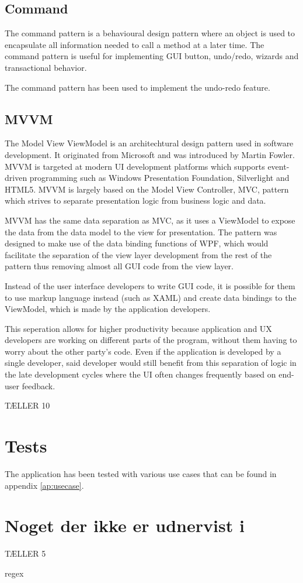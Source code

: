 \subsection{Command}
The command pattern is a behavioural design pattern where an object is used to encapsulate all information needed to call a method at a later time.
The command pattern is useful for implementing GUI button, undo/redo, wizards and transactional behavior.

The command pattern has been used to implement the undo-redo feature.

\subsection{MVVM}
The Model View ViewModel is an architechtural design pattern used in software development. It originated from Microsoft and was introduced by Martin Fowler.
MVVM is targeted at modern UI development platforms which supports event-driven programming such as Windows Presentation Foundation, Silverlight and HTML5.
MVVM is largely based on the Model View Controller, MVC, pattern which strives to separate presentation logic from business logic and data.

MVVM has the same data separation as MVC, as it uses a ViewModel to expose the data from the data model to the view for presentation.
The pattern was designed to make use of the data binding functions of WPF, which would facilitate the separation of the view layer development
from the rest of the pattern thus removing almost all GUI code from the view layer.

Instead of the user interface developers to write GUI code, it is possible for them to use markup language instead (such as XAML)
and create data bindings to the ViewModel, which is made by the application developers.

This seperation allows for higher productivity because application and UX developers are working on different parts of the program, 
without them having to worry about the other party's code.
Even if the application is developed by a single developer, said developer would still benefit from this separation of logic 
in the late development cycles where the UI often changes frequently based on end-user feedback.

TÆLLER 10


\section{Tests}
\label{sec:tests}

The application has been tested with various use cases that can be found in appendix \ref{ap:usecase}.

\section{Noget der ikke er udnervist i}

TÆLLER 5

regex